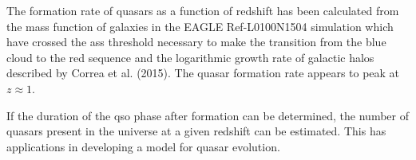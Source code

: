 \documentclass[12pt, twocolumn]{revtex4}    %
\begin{document}
The formation rate of quasars as a function of redshift has been calculated from the mass function of galaxies in the EAGLE Ref-L0100N1504 simulation which have crossed the ass threshold necessary to make the transition from the blue cloud to the red sequence and the logarithmic growth rate of galactic halos described by Correa et al. (2015). The quasar formation rate appears to peak at $z\approx1$.\par

If the duration of the qso phase after formation can be determined, the number of quasars present in the universe at a given redshift can be estimated. This has applications in developing a model for quasar evolution.



\end{document}
